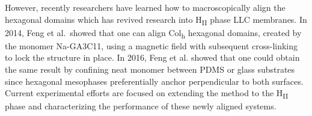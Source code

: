 \documentclass[journal=jpcbfk,manuscript=article]{achemso}
\begin{document}

  However, recently researchers have learned how to macroscopically align the
  hexagonal domains which has revived research into H\textsubscript{II} phase LLC
  membranes. In 2014, Feng et al.~showed that one can align Col\textsubscript{h}
  hexagonal domains, created by the monomer Na-GA3C11, using a magnetic field
  with subsequent cross-linking to lock the structure in
  place\cite{feng_scalable_2014}. In 2016, Feng et al. showed that one could
  obtain the same result by confining neat monomer between PDMS or glass
  substrates since hexagonal mesophases preferentially anchor perpendicular to
  both surfaces\cite{feng_thin_2016}. Current experimental efforts are focused
  on extending the method to the H\textsubscript{II} phase and characterizing
  the performance of these newly aligned systems.

\end{document}
